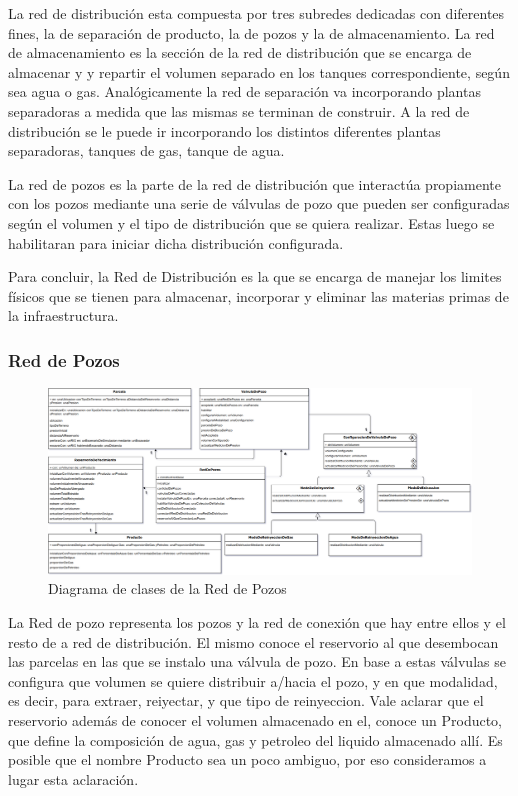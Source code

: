 \documentclass[10pt,a4paper]{article}
\begin{document}
La red de distribución esta compuesta por tres subredes dedicadas con diferentes fines, la de separación de producto, la de pozos y la de almacenamiento. La red de almacenamiento es la sección de la red de distribución que se encarga de almacenar y y repartir el volumen separado en los tanques correspondiente, según sea agua o gas. Analógicamente la red de separación va incorporando plantas separadoras a medida que las mismas se terminan de construir. A la red de distribución se le puede ir incorporando los distintos diferentes plantas separadoras, tanques de gas, tanque de agua.

La red de pozos es la parte de la red de distribución que interactúa propiamente con los pozos mediante una serie de válvulas de pozo que pueden ser configuradas según el volumen y el tipo de distribución que se quiera realizar. Estas luego se habilitaran para iniciar dicha distribución configurada.

Para concluir, la Red de Distribución es la que se encarga de manejar los limites físicos que se tienen para almacenar, incorporar y eliminar las materias primas de la infraestructura.

\subsubsection{Red de Pozos}

\begin{figure}[H]
\centerline{\includegraphics[scale=0.34]{images/DiagramaDeClases_deRedDePozos.png}}
\caption{Diagrama de clases de la Red de Pozos}
\end{figure}

La Red de pozo representa los pozos y la red de conexión que hay entre ellos y el resto de a red de distribución. El mismo conoce el reservorio al que desembocan las parcelas en las que se instalo una válvula de pozo. En base a estas válvulas se configura que volumen se quiere distribuir a/hacia el pozo, y en que modalidad, es decir, para extraer, reiyectar, y que tipo de reinyeccion. Vale aclarar que el reservorio además de conocer el volumen almacenado en el, conoce un Producto, que define la composición de agua, gas y petroleo del liquido almacenado allí. Es posible que el nombre Producto sea un poco ambiguo, por eso consideramos a lugar esta aclaración.
\end{document}
